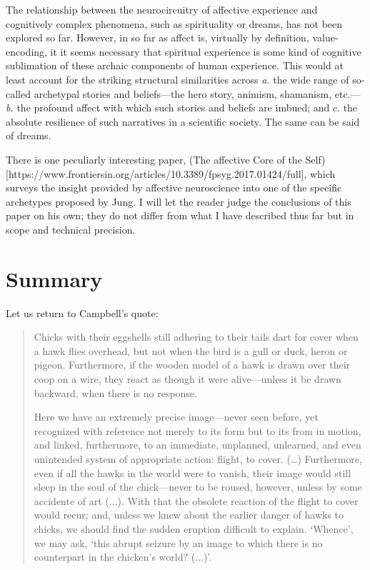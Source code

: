 \documentclass[a4paper]{article}
\begin{document}
The relationship between the neurocircuitry of affective experience and
cognitively complex phenomena, such as spirituality or dreams, has not been
explored so far. However, in so far as affect is, virtually by definition,
value-encoding, it it seems necessary that spiritual experience is some kind of
cognitive sublimation of these archaic components of human experience.
This would at least account for the striking structural similarities across
\textit{a.} the wide range of so-called archetypal stories and beliefs---the
hero story, animism, shamanism, etc.---\textit{b.} the profound affect with
which such stories and beliefs are imbued; and $c$. the absolute resilience of
such narratives in a scientific society. The same can be said of dreams. 

There is one peculiarly interesting paper, (The affective Core of the
Self)[https://www.frontiersin.org/articles/10.3389/fpsyg.2017.01424/full], which
surveys the insight provided by affective neuroscience into one of the specific
archetypes proposed by Jung. I will let the reader judge the conclusions of this
paper on his own; they do not differ from what I have described thus far but in
scope and technical precision.

\section{Summary}

Let us return to Campbell's quote:

\begin{quote}
    Chicks with their eggshells still adhering to their tails dart for
    cover when a hawk flies overhead, but not when the bird is a gull or
    duck, heron or pigeon. Furthermore, if the wooden model of a hawk is
    drawn over their coop on a wire, they react as though it were
    alive---unless it be drawn backward, when there is no response.

    Here we have an extremely precise image---never seen before, yet
    recognized with reference not merely to its form but to its from in
    motion, and linked, furthermore, to an immediate, unplanned, unlearned,
    and even unintended system of appropriate action: flight, to cover.
    (\ldots) Furthermore, even if all the hawks in the world were to
    vanish, their image would still sleep in the soul of the chick---never
    to be roused, however, unless by some accidente of art ($\ldots$). With
    that the obsolete reaction of the flight to cover would recur; and,
    unless we knew about the earlier danger of hawks to chicks, we should
    find the sudden eruption difficult to explain. \lq Whence\rq, we may
    ask, \lq this abrupt seizure by an image to which there is no
    counterpart in the chicken's world? ($\ldots$)\rq.
\end{quote}
\end{document}
